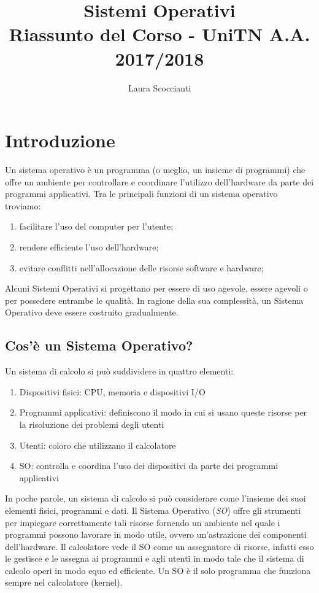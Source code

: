 \documentclass[a4paper]{article}
\title{%
  Sistemi Operativi \\
  \large Riassunto del Corso - UniTN A.A. 2017/2018}
\author{Laura Scoccianti}
\begin{document}
\maketitle

\tableofcontents

\newpage

\section{Introduzione}

Un sistema operativo è un programma (o meglio, un insieme di programmi) che offre un ambiente per controllare e coordinare l'utilizzo dell'hardware da parte dei programmi applicativi. Tra le principali funzioni di un sistema operativo troviamo:
\begin{enumerate}
   \item facilitare l'uso del computer per l'utente;
   \item rendere efficiente l'uso dell'hardware;
   \item evitare conflitti nell'allocazione delle risorse software e hardware;
\end{enumerate}
Alcuni Sistemi Operativi si progettano per essere di uso agevole, essere agevoli o per possedere entrambe le qualità. In ragione della sua complessità, un Sistema Operativo deve essere costruito gradualmente.

\subsection{Cos'è un Sistema Operativo?}

Un sistema di calcolo si può suddividere in quattro elementi:
\begin{enumerate}
   \item Dispositivi fisici: CPU, memoria e dispositivi I/O
   \item Programmi applicativi: definiscono il modo in cui si usano queste risorse per la risoluzione dei problemi degli utenti
   \item Utenti: coloro che utilizzano il calcolatore
   \item SO: controlla e coordina l’uso dei dispositivi da parte dei programmi applicativi
\end{enumerate}
In poche parole, un sistema di calcolo si può considerare come l’insieme dei suoi elementi fisici, programmi e dati. Il Sistema Operativo (\textit{SO}) offre gli strumenti per impiegare correttamente tali risorse fornendo un ambiente nel quale i programmi possono lavorare in modo utile, ovvero un'astrazione dei componenti dell'hardware. Il calcolatore vede il SO come un assegnatore di risorse, infatti esso le gestisce e le assegna ai programmi e agli utenti in modo tale che il sistema di calcolo operi in modo equo ed efficiente. Un SO è il solo programma che funziona sempre nel calcolatore (kernel).
\end{document}
